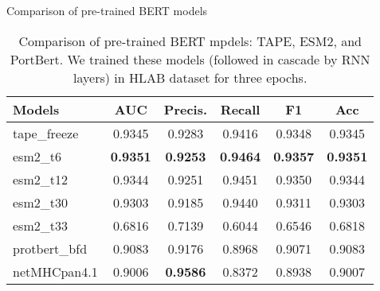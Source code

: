 \documentclass[10pt]{beamer}
\newcommand{\1}{
	\setbeamertemplate{background}{
		\texttt{[image: img/1]}
		\tikz[overlay] \fill[fill opacity=0.75,fill=white] (0,0) rectangle (-\paperwidth,\paperheight);
	}
}
\begin{document}
\begin{frame}{Comparison of pre-trained BERT models}{}
		 
		 \begin{table}[]
		 	\centering
		 	\caption{Comparison of pre-trained BERT mpdels: TAPE, ESM2, and PortBert. We trained these models (followed in cascade by RNN layers) in HLAB dataset for three epochs.}
		 	\setlength{\tabcolsep}{0.8em} %
		 	{\renewcommand{\arraystretch}{1.3}%
		 		
		 	
		 	\begin{tabular}{lccccc}
		 		\textbf{Models}       & \textbf{AUC}    & \textbf{Precis.} & \textbf{Recall} & \textbf{F1}     & \textbf{Acc}    \\ \hline
		 		tape\_freeze          & 0.9345          & 0.9283             & 0.9416          & 0.9348          & 0.9345          \\
		 		esm2\_t6      & \textbf{0.9351} & \textbf{0.9253}    & \textbf{0.9464} & \textbf{0.9357} & \textbf{0.9351} \\
		 		esm2\_t12     & 0.9344          & 0.9251    & 0.9451          & 0.9350          & 0.9344          \\
		 		esm2\_t30     & 0.9303          & 0.9185    & 0.9440          & 0.9311          & 0.9303          \\
		 		esm2\_t33     & 0.6816          & 0.7139             & 0.6044          & 0.6546          & 0.6818          \\
		 		protbert\_bfd & 0.9083          & 0.9176             & 0.8968          & 0.9071          & 0.9083          \\
		 		netMHCpan4.1          & 0.9006          & \textbf{0.9586}    & 0.8372          & 0.8938          & 0.9007         
		 	\end{tabular}
	 	
	 	}
		 \end{table}
	
\end{frame}

	
\end{document}
